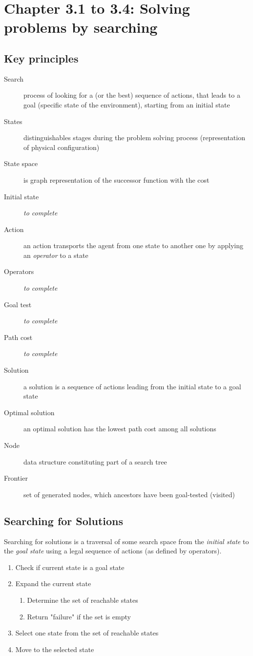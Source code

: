 \section{Chapter 3.1 to 3.4: Solving problems by searching}

\subsection{Key principles}

\begin{description}
\item[Search] process of looking for a (or the best) sequence of actions, that leads to a goal (specific state of the environment), starting from an initial state
\item[States] distinguishables stages during the problem solving process (representation of physical configuration)
\item[State space] is graph representation of the successor function with the cost
\item[Initial state] \textit{to complete}
\item[Action] an action transports the agent from one state to another one by applying an \textit{operator} to a state
\item[Operators] \textit{to complete}
\item[Goal test] \textit{to complete}
\item[Path cost] \textit{to complete}
\item[Solution] a solution is a sequence of actions leading from the initial state to a goal state
\item[Optimal solution] an optimal solution has the lowest path cost among all solutions
\item[Node] data structure constituting part of a search tree
\item[Frontier] set of generated nodes, which ancestors have been goal-tested (visited)
\end{description}

\subsection{Searching for Solutions}

Searching for solutions is a traversal of some search space from the \textit{initial state} to the \textit{goal state} using a legal sequence of actions (as defined by operators).

\begin{enumerate}
\item Check if current state is a goal state
\item Expand the current state
\begin{enumerate}
\item Determine the set of reachable states
\item Return "failure" if the set is empty
\end{enumerate}
\item Select one state from the set of reachable states
\item Move to the selected state
\end{enumerate}

